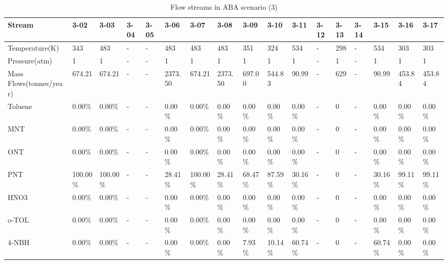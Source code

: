 \begin{landscape}
\begin{table}[H]
\centering
\caption{Flow streams in ABA scenario (3)}
\label{ABAFST3}
\begin{tabular}{|l|l|l|l|l|l|l|l|l|l|l|l|l|l|l|l|l|}
\hline
\textbf{Stream}         & 3-02     & 3-03     & 3-04 & 3-05 & 3-06    & 3-07     & 3-08    & 3-09    & 3-10    & 3-11    & 3-12 & 3-13 & 3-14 & 3-15    & 3-16    & 3-17    \\ \hline
Temperature(K)          & 343      & 483      & -    & -    & 483     & 483      & 483     & 351     & 324     & 534     & -    & 298  & -    & 534     & 303     & 303     \\ \hline
Pressure(atm)           & 1        & 1        & -    & -    & 1       & 1        & 1       & 1       & 1       & 1       & -    & 1    & -    & 1       & 1       & 1       \\ \hline
Mass Flows(tonnes/year) & 674.21   & 674.21   & -    & -    & 2373.50 & 674.21   & 2373.50 & 697.00  & 544.83  & 90.99   & -    & 629  & -    & 90.99   & 453.84  & 453.84  \\ \hline
Toluene                 & 0.00\%   & 0.00\%   & -    & -    & 0.00\%  & 0.00\%   & 0.00\%  & 0.00\%  & 0.00\%  & 0.00\%  & -    & 0    & -    & 0.00\%  & 0.00\%  & 0.00\%  \\ \hline
MNT                     & 0.00\%   & 0.00\%   & -    & -    & 0.00\%  & 0.00\%   & 0.00\%  & 0.00\%  & 0.00\%  & 0.00\%  & -    & 0    & -    & 0.00\%  & 0.00\%  & 0.00\%  \\ \hline
ONT                     & 0.00\%   & 0.00\%   & -    & -    & 0.00\%  & 0.00\%   & 0.00\%  & 0.00\%  & 0.00\%  & 0.00\%  & -    & 0    & -    & 0.00\%  & 0.00\%  & 0.00\%  \\ \hline
PNT                     & 100.00\% & 100.00\% & -    & -    & 28.41\% & 100.00\% & 28.41\% & 68.47\% & 87.59\% & 30.16\% & -    & 0    & -    & 30.16\% & 99.11\% & 99.11\% \\ \hline
HNO3                    & 0.00\%   & 0.00\%   & -    & -    & 0.00\%  & 0.00\%   & 0.00\%  & 0.00\%  & 0.00\%  & 0.00\%  & -    & 0    & -    & 0.00\%  & 0.00\%  & 0.00\%  \\ \hline
o-TOL                   & 0.00\%   & 0.00\%   & -    & -    & 0.00\%  & 0.00\%   & 0.00\%  & 0.00\%  & 0.00\%  & 0.00\%  & -    & 0    & -    & 0.00\%  & 0.00\%  & 0.00\%  \\ \hline
4-NBH                   & 0.00\%   & 0.00\%   & -    & -    & 0.00\%  & 0.00\%   & 0.00\%  & 7.93\%  & 10.14\% & 60.74\% & -    & 0    & -    & 60.74\% & 0.00\%  & 0.00\%  \\ \hline

\end{tabular}
\end{table}
\end{landscape}
